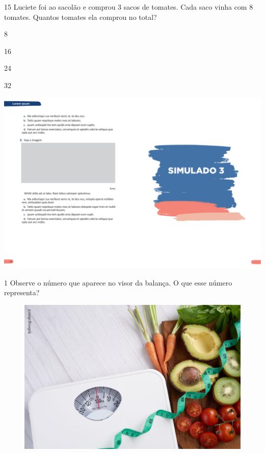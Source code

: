 \num{15} Luciete foi ao sacolão e comprou 3 sacos de tomates. Cada saco vinha com
8 tomates. Quantos tomates ela comprou no total?

\begin{escolha}
\item 8

\item 16

\item 24

\item 32
\end{escolha}

\blankpage
\vspace*{-3.4cm}
\hspace*{-3.7cm}\includegraphics[scale=1]{../watermarks/3simulado5ano.pdf}


\num{1} Observe o número que aparece no visor da balança. O que esse número
representa?

\begin{figure}[htpb!]
\centering
\includegraphics[width=.5\textwidth]{./media/image137.png}
\end{figure}

